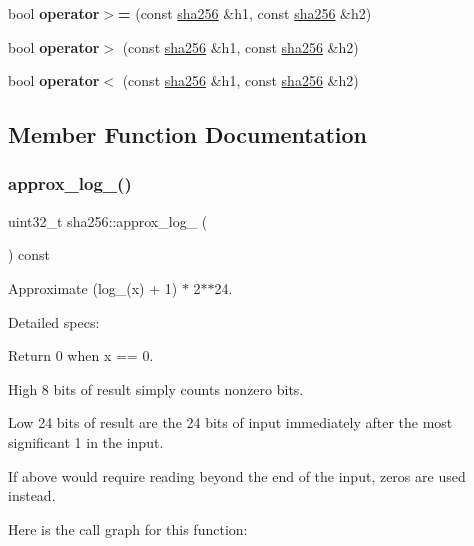 \begin{DoxyCompactItemize}
\item 
\mbox{\label{classfc_1_1sha256_afe5fc8b461023cdf6b2910887a40e4a9}} 
bool {\bfseries operator$>$=} (const \mbox{\hyperlink{classfc_1_1sha256}{sha256}} \&h1, const \mbox{\hyperlink{classfc_1_1sha256}{sha256}} \&h2)
\item 
\mbox{\label{classfc_1_1sha256_aebda3e73d07ef82c0e645483d7053a00}} 
bool {\bfseries operator$>$} (const \mbox{\hyperlink{classfc_1_1sha256}{sha256}} \&h1, const \mbox{\hyperlink{classfc_1_1sha256}{sha256}} \&h2)
\item 
\mbox{\label{classfc_1_1sha256_af7015e3408496f37408ec75905f766b1}} 
bool {\bfseries operator$<$} (const \mbox{\hyperlink{classfc_1_1sha256}{sha256}} \&h1, const \mbox{\hyperlink{classfc_1_1sha256}{sha256}} \&h2)
\end{DoxyCompactItemize}


\subsection{Member Function Documentation}
\mbox{\label{classfc_1_1sha256_a6969c0815acf46aebe70253fb9356078}} 
\subsubsection{\texorpdfstring{approx\+\_\+log\+\_()}{approx\_log\_32()}}
{\footnotesize\ttfamily uint32\+\_\+t sha256\+::approx\+\_\+log\+\_ (\begin{DoxyParamCaption}{ }\end{DoxyParamCaption}) const}

Approximate (log\+\_(x) + 1) $\ast$ 2$\ast$$\ast$24.

Detailed specs\+:
\begin{DoxyItemize}
\item Return 0 when x == 0.
\item High 8 bits of result simply counts nonzero bits.
\item Low 24 bits of result are the 24 bits of input immediately after the most significant 1 in the input.
\item If above would require reading beyond the end of the input, zeros are used instead. 
\end{DoxyItemize}Here is the call graph for this function\+:
\mbox{\label{classfc_1_1sha256_a3216a8dc2e6f346a2d892b3e8f8fcf1e}} 
